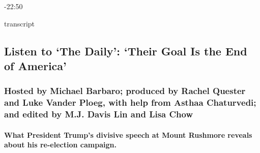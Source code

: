 -22:50

transcript

\hypertarget{listen-to-the-daily-their-goal-is-the-end-of-america-1}{%
\subsection{Listen to `The Daily': `Their Goal Is the End of
America'}\label{listen-to-the-daily-their-goal-is-the-end-of-america-1}}

\hypertarget{hosted-by-michael-barbaro-produced-by-rachel-quester-and-luke-vander-ploeg-with-help-from-asthaa-chaturvedi-and-edited-by-mj-davis-lin-and-lisa-chow}{%
\subsubsection{Hosted by Michael Barbaro; produced by Rachel Quester and
Luke Vander Ploeg, with help from Asthaa Chaturvedi; and edited by M.J.
Davis Lin and Lisa
Chow}\label{hosted-by-michael-barbaro-produced-by-rachel-quester-and-luke-vander-ploeg-with-help-from-asthaa-chaturvedi-and-edited-by-mj-davis-lin-and-lisa-chow}}

\hypertarget{what-president-trumps-divisive-speech-at-mount-rushmore-reveals-about-his-re-election-campaign}{%
\paragraph{What President Trump's divisive speech at Mount Rushmore
reveals about his re-election
campaign.}\label{what-president-trumps-divisive-speech-at-mount-rushmore-reveals-about-his-re-election-campaign}}

